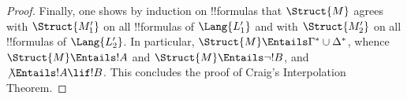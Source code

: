 \documentclass[../../include/open-logic-section]{subfiles}
\begin{document}
\begin{proof}
Finally, one shows by induction on !!{formula}s that $\Struct{M}$ agrees
with $\Struct{M'_1}$ on all !!{formula}s of $\Lang{L'_1}$ and with
$\Struct{M'_2}$ on all !!{formula}s of $\Lang{L'_2}$. In particular,
$\Struct{M} \Entails \Gamma^* \cup \Delta^*$, whence $\Struct{M}
\Entails !A$ and $\Struct{M} \Entails \lnot!B$, and
$\not\Entails !A \lif !B$. This concludes the proof of
Craig's Interpolation Theorem.
\end{proof}
\end{document}
